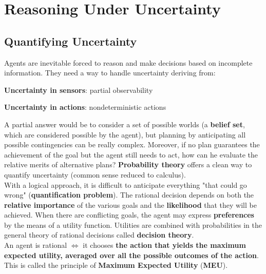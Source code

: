 \documentclass[10pt]{report}
\begin{document}
\section{Reasoning Under Uncertainty}
\subsection{Quantifying Uncertainty}
Agents are inevitable forced to reason and make decisions based on incomplete information. They need a way to handle uncertainty deriving from:
\begin{list}{}{}
	\item \textbf{Uncertainty in sensors}: partial observability
	\item \textbf{Uncertainty in actions}: nondeterministic actions
\end{list}
A partial answer would be to consider a set of possible worlds (a \textbf{belief set}, which are considered possible by the agent), but planning by anticipating all possible contingencies can be really complex. Moreover, if no plan guarantees the achievement of the goal but the agent still needs to act, how can he evaluate the relative merits of alternative plans? \textbf{Probability theory} offers a clean way to quantify uncertainty (common sense reduced to calculus).\\
With a logical approach, it is difficult to anticipate everything "that could go wrong" (\textbf{quantification problem}). The rational decision depends on both the \textbf{relative importance} of the various goals and the \textbf{likelihood} that they will be achieved. When there are conflicting goals, the agent may express \textbf{preferences} by the means of a utility function. Utilities are combined with probabilities in the general theory of rational decisions called \textbf{decision theory}.\\
An agent is rational $\Leftrightarrow$ it chooses \textbf{the action that yields the maximum expected utility, averaged over all the possible outcomes of the action}. This is called the principle of \textbf{Maximum Expected Utility} (\textbf{MEU}).
\end{document}

